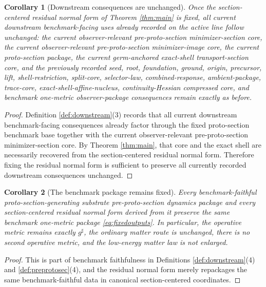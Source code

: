 \documentclass[11pt]{article}
\newcommand{\CompletedMetric}{g^{\sharp}}
\newtheorem{corollary}{Corollary}
\begin{document}
\begin{corollary}[Downstream consequences are unchanged]
\label{cor:downstream}
Once the section-centered residual normal form of Theorem \ref{thm:main} is fixed, all current downstream benchmark-facing uses already recorded on the active line follow unchanged: the current observer-relevant pre-proto-section minimizer-section core, the current observer-relevant pre-proto-section minimizer-image core, the current proto-section package, the current germ-anchored exact-shell transport-section core, and the previously recorded seed, root, foundation, ground, origin, precursor, lift, shell-restriction, split-core, selector-law, combined-response, ambient-package, trace-core, exact-shell-affine-nucleus, continuity-Hessian compressed core, and benchmark one-metric observer-package consequences remain exactly as before.
\end{corollary}

\begin{proof}
Definition \ref{def:downstream}(3) records that all current downstream benchmark-facing consequences already factor through the fixed proto-section benchmark base together with the current observer-relevant pre-proto-section minimizer-section core. By Theorem \ref{thm:main}, that core and the exact shell are necessarily recovered from the section-centered residual normal form. Therefore fixing the residual normal form is sufficient to preserve all currently recorded downstream consequences unchanged.
\end{proof}

\begin{corollary}[The benchmark package remains fixed]
\label{cor:benchmark}
Every benchmark-faithful proto-section-generating substrate pre-proto-section dynamics package and every section-centered residual normal form derived from it preserve the same benchmark one-metric package \eqref{eq:fixedoutputs}. In particular, the operative metric remains exactly \(\CompletedMetric\), the ordinary matter route is unchanged, there is no second operative metric, and the low-energy matter law is not enlarged.
\end{corollary}

\begin{proof}
This is part of benchmark faithfulness in Definitions \ref{def:downstream}(4) and \ref{def:preprotosec}(4), and the residual normal form merely repackages the same benchmark-faithful data in canonical section-centered coordinates.
\end{proof}
\end{document}

